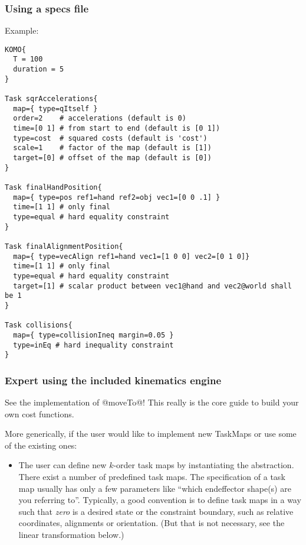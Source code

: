 \documentclass[10pt,fleqn,twoside]{article}
\begin{document}
{{\subsubsection{Using a specs file}

Example:
\begin{code}
\begin{verbatim}
KOMO{
  T = 100
  duration = 5
}

Task sqrAccelerations{
  map={ type=qItself }
  order=2    # accelerations (default is 0)
  time=[0 1] # from start to end (default is [0 1])
  type=cost  # squared costs (default is 'cost')
  scale=1    # factor of the map (default is [1])
  target=[0] # offset of the map (default is [0])
}

Task finalHandPosition{
  map={ type=pos ref1=hand ref2=obj vec1=[0 0 .1] }
  time=[1 1] # only final
  type=equal # hard equality constraint
}

Task finalAlignmentPosition{
  map={ type=vecAlign ref1=hand vec1=[1 0 0] vec2=[0 1 0]}
  time=[1 1] # only final
  type=equal # hard equality constraint
  target=[1] # scalar product between vec1@hand and vec2@world shall be 1
}

Task collisions{
  map={ type=collisionIneq margin=0.05 }
  type=inEq # hard inequality constraint
}
\end{verbatim}
\end{code}



\subsubsection{Expert using the included kinematics engine}

See the implementation of @moveTo@! This really is the core guide to
build your own cost functions.

More generically, if the user would like to implement new TaskMaps or
use some of the existing ones:
\begin{itemize}
\item The user can define new $k$-order task maps by instantiating the
abstraction. There exist a number of predefined task maps. The
specification of a task map usually has only a few parameters like
``which endeffector shape(s) are you referring to''. Typically, a good
convention is to define task maps in a way such that \emph{zero} is a
desired state or the constraint boundary, such as relative
coordinates, alignments or orientation. (But that is not necessary,
see the linear transformation below.)


\end{itemize}}}
\end{document}
